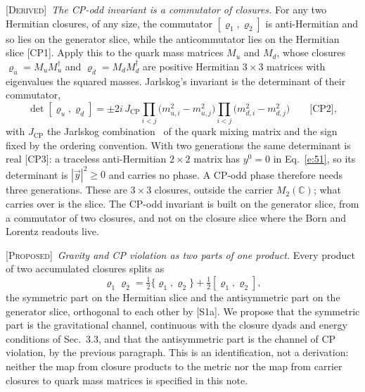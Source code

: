 \documentclass[10pt]{article}
\newcommand{\Derived}{\noindent\textsc{[Derived]}\ }
\newcommand{\Proposed}{\noindent\textsc{[Proposed]}\ }
\begin{document}
\smallskip
\Derived \textit{The CP-odd invariant is a commutator of closures.} For any two Hermitian closures, of any size, the commutator $[\varrho_1,\varrho_2]$ is anti-Hermitian and so lies on the generator slice, while the anticommutator lies on the Hermitian slice [CP1]. Apply this to the quark mass matrices $M_u$ and $M_d$, whose closures $\varrho_u=M_uM_u^\dagger$ and $\varrho_d=M_dM_d^\dagger$ are positive Hermitian $3\times3$ matrices with eigenvalues the squared masses. Jarlskog's invariant is the determinant of their commutator,
\begin{equation*}
\det[\varrho_u,\varrho_d]=\pm2i\,J_{\mathrm{CP}}\prod_{i<j}\bigl(m_{u,i}^2-m_{u,j}^2\bigr)\prod_{i<j}\bigl(m_{d,i}^2-m_{d,j}^2\bigr)\qquad\text{[CP2]},
\end{equation*}
with $J_{\mathrm{CP}}$ the Jarlskog combination~\cite{jarlskog} of the quark mixing matrix and the sign fixed by the ordering convention. With two generations the same determinant is real [CP3]: a traceless anti-Hermitian $2\times2$ matrix has $y^0=0$ in Eq.~\eqref{e:51}, so its determinant is $|\vec y|^2\ge0$ and carries no phase. A CP-odd phase therefore needs three generations. These are $3\times3$ closures, outside the carrier $M_2(\mathbb C)$; what carries over is the slice. The CP-odd invariant is built on the generator slice, from a commutator of two closures, and not on the closure slice where the Born and Lorentz readouts live.

\smallskip
\Proposed \textit{Gravity and CP violation as two parts of one product.} Every product of two accumulated closures splits as
\begin{equation*}
\varrho_1\varrho_2=\tfrac12\{\varrho_1,\varrho_2\}+\tfrac12[\varrho_1,\varrho_2],
\end{equation*}
the symmetric part on the Hermitian slice and the antisymmetric part on the generator slice, orthogonal to each other by [S1a]. We propose that the symmetric part is the gravitational channel, continuous with the closure dyads and energy conditions of Sec.~3.3, and that the antisymmetric part is the channel of CP violation, by the previous paragraph. This is an identification, not a derivation: neither the map from closure products to the metric nor the map from carrier closures to quark mass matrices is specified in this note.
\end{document}
